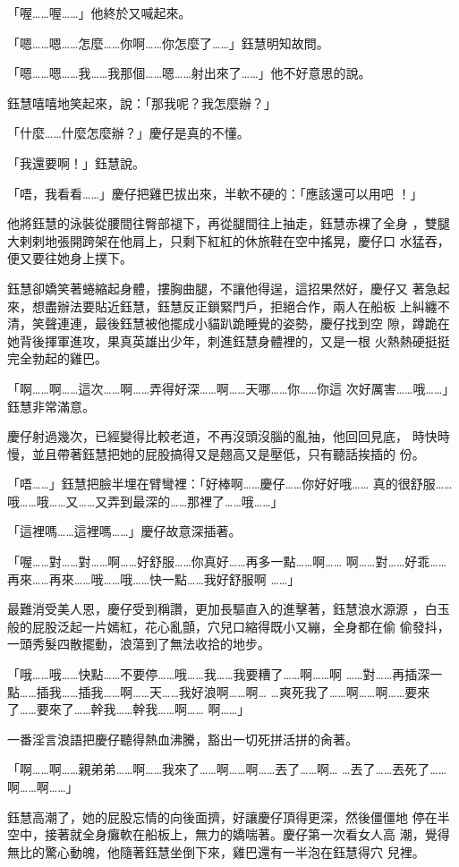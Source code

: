 「喔……喔……」他終於又喊起來。

「嗯……嗯……怎麼……你啊……你怎麼了……」鈺慧明知故問。

「嗯……嗯……我……我那個……嗯……射出來了……」他不好意思的說。

鈺慧嘻嘻地笑起來，說：「那我呢？我怎麼辦？」

「什麼……什麼怎麼辦？」慶仔是真的不懂。

「我還要啊！」鈺慧說。

「唔，我看看……」慶仔把雞巴拔出來，半軟不硬的：「應該還可以用吧
！」

他將鈺慧的泳裝從腰間往臀部褪下，再從腿間往上抽走，鈺慧赤裸了全身
，雙腿大剌剌地張開跨架在他肩上，只剩下紅紅的休旅鞋在空中搖晃，慶仔口
水猛吞，便又要往她身上撲下。

鈺慧卻嬌笑著蜷縮起身體，摟胸曲腿，不讓他得逞，這招果然好，慶仔又
著急起來，想盡辦法要貼近鈺慧，鈺慧反正鎖緊門戶，拒絕合作，兩人在船板
上糾纏不清，笑聲連連，最後鈺慧被他擺成小貓趴跪睡覺的姿勢，慶仔找到空
隙，蹲跪在她背後揮軍進攻，果真英雄出少年，刺進鈺慧身體裡的，又是一根
火熱熱硬挺挺完全勃起的雞巴。

「啊……啊……這次……啊……弄得好深……啊……天哪……你……你這
次好厲害……哦……」鈺慧非常滿意。

慶仔射過幾次，已經變得比較老道，不再沒頭沒腦的亂抽，他回回見底，
時快時慢，並且帶著鈺慧把她的屁股搞得又是翹高又是壓低，只有聽話挨插的
份。

「唔……」鈺慧把臉半埋在臂彎裡：「好棒啊……慶仔……你好好哦……
真的很舒服……哦……哦……又……又弄到最深的……那裡了……哦……」

「這裡嗎……這裡嗎……」慶仔故意深插著。

「喔……對……對……啊……好舒服……你真好……再多一點……啊……
啊……對……好乖……再來……再來……哦……哦……快一點……我好舒服啊
……」

最難消受美人恩，慶仔受到稱讚，更加長驅直入的進擊著，鈺慧浪水源源
，白玉般的屁股泛起一片嫣紅，花心亂顫，穴兒口縮得既小又繃，全身都在偷
偷發抖，一頭秀髮四散擺動，浪蕩到了無法收拾的地步。

「哦……哦……快點……不要停……哦……我……我要糟了……啊……啊
……對……再插深一點……插我……插我……啊……天……我好浪啊……啊…
…爽死我了……啊……啊……要來了……要來了……幹我……幹我……啊……
啊……」

一番淫言浪語把慶仔聽得熱血沸騰，豁出一切死拼活拼的肏著。

「啊……啊……親弟弟……啊……我來了……啊……啊……丟了……啊…
…丟了……丟死了……啊……啊……」

鈺慧高潮了，她的屁股忘情的向後面擠，好讓慶仔頂得更深，然後僵僵地
停在半空中，接著就全身癱軟在船板上，無力的嬌喘著。慶仔第一次看女人高
潮，覺得無比的驚心動魄，他隨著鈺慧坐倒下來，雞巴還有一半泡在鈺慧得穴
兒裡。

